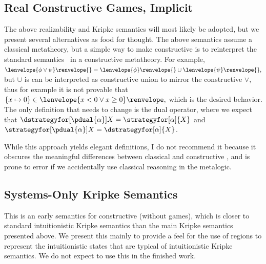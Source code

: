 \documentclass[12pt]{cmuthesis}
\theoremstyle{definition}
\theoremstyle{remark}
\newcommand{\fint}[1]{\lenvelope{#1}\renvelope}
\begin{document}
\subsection{Real Constructive Games, Implicit}
The above realizability and Kripke semantics will most likely be adopted, but we present several alternatives as food for thought.
The above semantics assume a classical metatheory, but a simple way to make \dGL constructive is to reinterpret the standard \dGL semantics~\cite{DBLP:journals/tocl/Platzer17} in a constructive metatheory.
For example, $\fint{\phi \lor \psi}{} = \fint{\phi}{} \cup \fint{\psi}{},$ but $\cup$ is can be interpreted as constructive union to mirror the constructive $\lor,$ thus for example it is not provable that $\{x \mapsto 0\} \in \fint{x < 0 \lor x \geq 0},$ which is the desired behavior.
The only definition that needs to change is the dual operator, where we expect that $\dstrategyfor[\pdual{\alpha}]{X} = \strategyfor[\alpha]{X}$ and $\strategyfor[\pdual{\alpha}]{X} = \dstrategyfor[\alpha]{X}$.

While this approach yields elegant definitions, I do not recommend it because it obscures the meaningful differences between classical and constructive \dGL, and is prone to error if we accidentally use classical reasoning in the metalogic.

\subsection{Systems-Only Kripke Semantics}
This is an early semantics for constructive \dL (without games), which is closer to standard intuitionistic Kripke semantics than the main Kripke semantics presented above.
We present this mainly to provide a feel for the use of regions to represent the intuitionistic states that are typical of intuitionistic Kripke semantics.
We do not expect to use this in the finished work.
\end{document}
